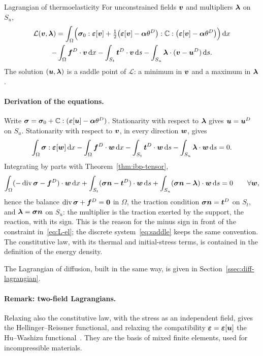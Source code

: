 \begin{gbox}{Lagrangian of thermoelasticity}
For unconstrained fields $\bm{v}$ and multipliers $\bm{\lambda}$ on $S_u$,
\begin{multline}\label{eq:L-el}
  \mathcal L(\bm{v},\bm{\lambda})=\int_\Omega\Bigl(\bm{\sigma}_0:\bm{\varepsilon}[\bm{v}]
  +\tfrac12\bigl(\bm{\varepsilon}[\bm{v}]-\bm{\alpha}\theta^D\bigr):\mathbb{C}:\bigl(\bm{\varepsilon}[\bm{v}]-\bm{\alpha}\theta^D\bigr)\Bigr)\,\mathrm{d} x\\
  -\int_\Omega\bm{f}^{D}\cdot\bm{v}\,\mathrm{d} x-\int_{S_t}\bm{t}^{D}\cdot\bm{v}\,\mathrm{d} s
  -\int_{S_u}\bm{\lambda}\cdot(\bm{v}-\bm{u}^{D})\,\mathrm{d} s .
\end{multline}
The solution $(\bm{u},\bm{\lambda})$ is a saddle point of $\mathcal L$: a minimum in
$\bm{v}$ and a maximum in $\bm{\lambda}$.
\end{gbox}
\paragraph{Derivation of the equations.} Write
$\bm{\sigma}=\bm{\sigma}_0+\mathbb{C}:(\bm{\varepsilon}[\bm{u}]-\bm{\alpha}\theta^D)$. Stationarity with respect to
$\bm{\lambda}$ gives $\bm{u}=\bm{u}^{D}$ on $S_u$. Stationarity with respect to $\bm{v}$, in
every direction $\bm{w}$, gives
\[
  \int_\Omega\bm{\sigma}:\bm{\varepsilon}[\bm{w}]\,\mathrm{d} x-\int_\Omega\bm{f}^{D}\cdot\bm{w}\,\mathrm{d} x
  -\int_{S_t}\bm{t}^{D}\cdot\bm{w}\,\mathrm{d} s-\int_{S_u}\bm{\lambda}\cdot\bm{w}\,\mathrm{d} s=0 .
\]
Integrating by parts with Theorem~\ref{thm:ibp-tensor},
\[
  \int_\Omega(-\operatorname{div}\bm{\sigma}-\bm{f}^{D})\cdot\bm{w}\,\mathrm{d} x+\int_{S_t}(\bm{\sigma}\bm{n}-\bm{t}^{D})\cdot\bm{w}\,\mathrm{d} s
  +\int_{S_u}(\bm{\sigma}\bm{n}-\bm{\lambda})\cdot\bm{w}\,\mathrm{d} s=0\qquad\forall\bm{w},
\]
hence the balance $\operatorname{div}\bm{\sigma}+\bm{f}^{D}=\bm{0}$ in $\Omega$, the traction condition
$\bm{\sigma}\bm{n}=\bm{t}^{D}$ on $S_t$, and $\bm{\lambda}=\bm{\sigma}\bm{n}$ on $S_u$: the multiplier is
the traction exerted by the support, the reaction, with its sign. This is
the reason for the minus sign in front of the constraint
in~\eqref{eq:L-el}; the discrete system~\eqref{eq:saddle} keeps the same
convention. The constitutive law,
with its thermal and initial-stress terms, is contained in the definition of
the energy density.

The Lagrangian of diffusion, built in the same way, is given in
Section~\ref{ssec:diff-lagrangian}.

\paragraph{Remark: two-field Lagrangians.} Relaxing also the constitutive law,
with the stress as an independent field, gives the Hellinger--Reissner
functional, and relaxing the compatibility $\bm{\varepsilon}=\bm{\varepsilon}[\bm{u}]$ the Hu--Washizu
functional~\cite{BonnetFrangi2007}. They are the basis of mixed finite
elements, used for incompressible materials.

